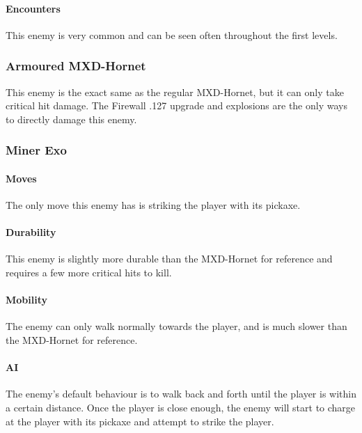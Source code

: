 \documentclass[12pt]{article}
\begin{document}
\paragraph{Encounters}

This enemy is very common and can be seen often throughout the first levels.

\subsubsection{Armoured MXD-Hornet}

This enemy is the exact same as the regular MXD-Hornet, but it can only take critical hit damage. The Firewall .127 upgrade and explosions are the only ways to directly damage this enemy. 

\subsubsection{Miner Exo}

\paragraph{Moves}

The only move this enemy has is striking the player with its pickaxe.

\paragraph{Durability}

This enemy is slightly more durable than the MXD-Hornet for reference and requires a few more critical hits to kill. 

\paragraph{Mobility}

The enemy can only walk normally towards the player, and is much slower than the MXD-Hornet for reference.

\paragraph{AI}

The enemy's default behaviour is to walk back and forth until the player is within a certain distance. Once the player is close enough, the enemy will start to charge at the player with its pickaxe and attempt to strike the player.
\end{document}
